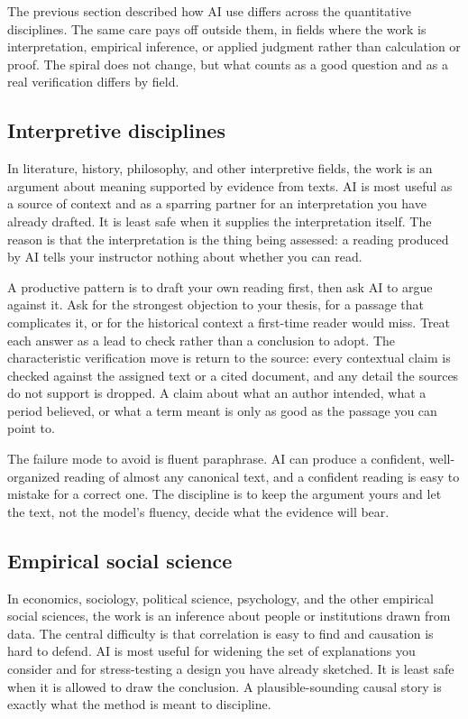 \documentclass{SIAMbook2023}
\begin{document}
The previous section described how AI use differs across the quantitative disciplines. The same care pays off outside them, in fields where the work is interpretation, empirical inference, or applied judgment rather than calculation or proof. The spiral does not change, but what counts as a good question and as a real verification differs by field.

\subsection{Interpretive disciplines}
\label{subsec:interpretive-disciplines}%
%

In literature, history, philosophy, and other interpretive fields, the work is an argument about meaning supported by evidence from texts. AI is most useful as a source of context and as a sparring partner for an interpretation you have already drafted. It is least safe when it supplies the interpretation itself. The reason is that the interpretation is the thing being assessed: a reading produced by AI tells your instructor nothing about whether you can read.

A productive pattern is to draft your own reading first, then ask AI to argue against it. Ask for the strongest objection to your thesis, for a passage that complicates it, or for the historical context a first-time reader would miss. Treat each answer as a lead to check rather than a conclusion to adopt. The characteristic verification move is return to the source: every contextual claim is checked against the assigned text or a cited document, and any detail the sources do not support is dropped. A claim about what an author intended, what a period believed, or what a term meant is only as good as the passage you can point to.

The failure mode to avoid is fluent paraphrase. AI can produce a confident, well-organized reading of almost any canonical text, and a confident reading is easy to mistake for a correct one. The discipline is to keep the argument yours and let the text, not the model's fluency, decide what the evidence will bear.

\subsection{Empirical social science}
\label{subsec:empirical-social-science}

In economics, sociology, political science, psychology, and the other empirical social sciences, the work is an inference about people or institutions drawn from data. The central difficulty is that correlation is easy to find and causation is hard to defend. AI is most useful for widening the set of explanations you consider and for stress-testing a design you have already sketched. It is least safe when it is allowed to draw the conclusion. A plausible-sounding causal story is exactly what the method is meant to discipline.
\end{document}
